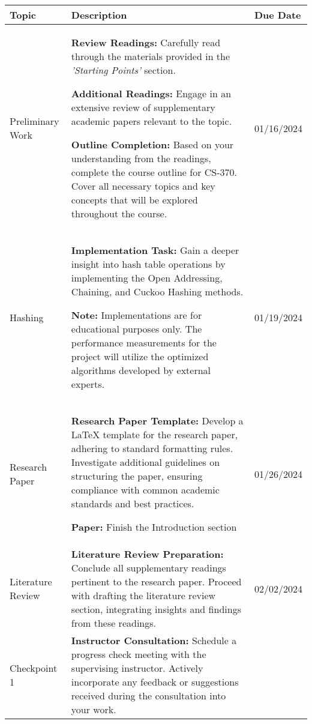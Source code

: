 \documentclass[11pt]{article}
\begin{document}
\begin{table}[h!]
    \centering
        \begin{tabular}{ | m{3cm} | m{10cm}| m{2cm} | }
        \hline
        \textbf{Topic} & \textbf{Description} & \textbf{ Due Date} \\
        \hline
        Preliminary Work &
            \textbf{Review Readings:} Carefully read through the materials provided in the \emph{'Starting Points'} section.

            \textbf{Additional Readings:} Engage in an extensive review of supplementary academic papers relevant to the topic.
    
            \textbf{Outline Completion:} Based on your understanding from the readings, complete the course outline for CS-370. Cover all necessary topics and key concepts that will be explored throughout the course.
        & 01/16/2024 \\

        \hline
        Hashing & 
            \textbf{Implementation Task:} Gain a deeper insight into hash table operations by implementing the Open Addressing, Chaining, and Cuckoo Hashing methods.
            
            \textbf{Note:} Implementations are for educational purposes only. The performance measurements for the project will utilize the optimized algorithms developed by external experts.
        & 01/19/2024 \\

        \hline
        Research Paper & 
            \textbf{Research Paper Template:} Develop a LaTeX template for the research paper, adhering to standard formatting rules. Investigate additional guidelines on structuring the paper, ensuring compliance with common academic standards and best practices.

            \textbf{Paper:} Finish the Introduction section
        & 01/26/2024 \\

        \hline
        Literature Review &
            \textbf{Literature Review Preparation:} Conclude all supplementary readings pertinent to the research paper. Proceed with drafting the literature review section, integrating insights and findings from these readings.
        & 02/02/2024 \\

        \hline
        Checkpoint 1 & 
            \textbf{Instructor Consultation:} Schedule a progress check meeting with the supervising instructor. Actively incorporate any feedback or suggestions received during the consultation into your work.


\end{tabular}
\end{table}
\end{document}
